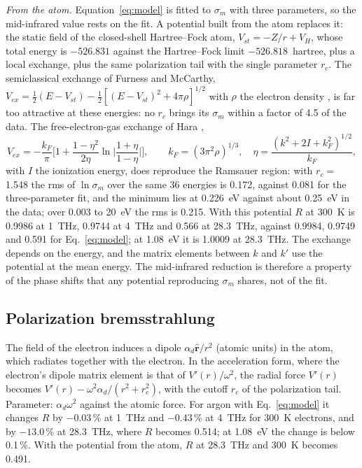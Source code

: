 \documentclass[11pt]{article}
\numberwithin{equation}{section}
\begin{document}
{\noindent}\emph{From the atom.} Equation~\eqref{eq:model} is fitted to $\sigma_m$ with three
parameters, so the mid-infrared value rests on the fit. A potential built from the atom
replaces it: the static field of the closed-shell Hartree--Fock atom, $V_{st}=-Z/r+V_H$, whose
total energy is $-526.831$ against the Hartree--Fock limit $-526.818$~hartree, plus a local
exchange, plus the same polarization tail with the single parameter $r_c$. The semiclassical
exchange of Furness and McCarthy, $V_{ex}=\tfrac12(E-V_{st})-\tfrac12[(E-V_{st})^2+4\pi\rho]^{1/2}$
with $\rho$ the electron density \cite{FurnessMcCarthy1973}, is far too attractive at these
energies: no $r_c$ brings its $\sigma_m$ within a factor of 4.5 of the data. The free-electron-gas
exchange of Hara \cite{Hara1967},
\begin{equation}
V_{ex}=-\frac{k_F}{\pi}\Big[1+\frac{1-\eta^2}{2\eta}\ln\Big|\frac{1+\eta}{1-\eta}\Big|\Big],\qquad
k_F=(3\pi^2\rho)^{1/3},\quad\eta=\frac{(k^2+2I+k_F^2)^{1/2}}{k_F},
\label{eq:hara}
\end{equation}
with $I$ the ionization energy, does reproduce the Ramsauer region: with $r_c=$1.548 the rms of
$\ln\sigma_m$ over the same 36 energies is 0.172, against 0.081 for the three-parameter fit,
and the minimum lies at 0.226~eV against about 0.25~eV in the data; over 0.003 to 20~eV the rms
is 0.215. With this potential $R$ at 300~K is 0.9986 at 1~THz, 0.9744 at 4~THz and 0.566 at
28.3~THz, against 0.9984, 0.9749 and 0.591 for Eq.~\eqref{eq:model}; at 1.08~eV it is 1.0009
at 28.3~THz. The exchange depends on the energy, and the matrix elements between $k$ and $k'$
use the potential at the mean energy. The mid-infrared reduction is therefore a property of
the phase shifts that any potential reproducing $\sigma_m$ shares, not of the fit.

\subsection{Polarization bremsstrahlung}
\label{sec:polbrems}
The field of the electron induces a dipole $\alpha_d\hat{\mathbf r}/r^2$ (atomic units) in the atom,
which radiates together with the electron. In the acceleration form, where the electron's dipole
matrix element is that of $V'(r)/\omega^2$, the radial force $V'(r)$ becomes
$V'(r)-\omega^2\alpha_d/(r^2+r_c^2)$, with the cutoff $r_c$ of the polarization tail.
Parameter: $\alpha_d\omega^2$ against the atomic force. For argon with Eq.~\eqref{eq:model} it
changes $R$ by $-0.03$\,\% at 1~THz and $-0.43$\,\% at 4~THz for 300~K electrons, and by
$-13.0$\,\% at 28.3~THz, where $R$ becomes 0.514; at 1.08~eV the change is below 0.1\,\%. With
the potential from the atom, $R$ at 28.3~THz and 300~K becomes 0.491.
\end{document}
